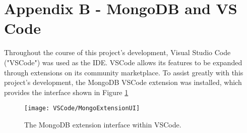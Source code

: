 \begingroup
\renewcommand\thechapter{B}
\titleformat{\chapter}[display]
{\normalfont\huge\bfseries}{}{20pt}{\Huge}
\setcounter{section}{0}
\setcounter{figure}{0} 

\chapter*{Appendix B - MongoDB and VS Code}

Throughout the course of this project's development, Visual Studio Code ("VSCode") was used as the IDE.
VSCode allows its features to be expanded through extensions on its community marketplace. To assist greatly with 
this project's development, the MongoDB VSCode extension was installed, which provides the interface shown in 
Figure \ref{fig:VSCodeMongoUI}

\begin{figure}[H]
    \centering
    \texttt{[image: VSCode/MongoExtensionUI]}
    \caption{The MongoDB extension interface within VSCode.\label{fig:VSCodeMongoUI}}
\end{figure}



\endgroup
